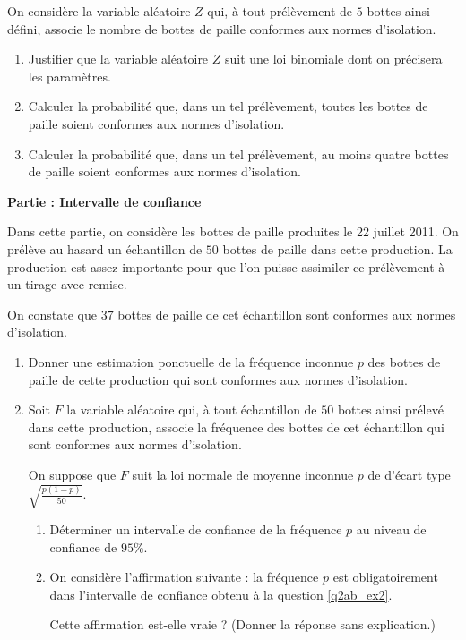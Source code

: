 \documentclass[10pt,a4paper]{article}
\newcounter{num}
\newcounter{Partie}
\newcommand{\Partie}[1]%
   {%
   \goodbreak%
   \addtocounter{Partie}{1}
   \noindent\textbf{Partie \Alph{Partie} : #1}%
   \par%
   }%
\begin{document}
On considère la variable aléatoire $Z$ qui, à tout prélèvement de $5$ bottes
ainsi défini, associe le nombre de bottes de paille conformes aux normes
d'isolation.

\begin{enumerate}
 \item Justifier que la variable aléatoire $Z$ suit une loi binomiale dont on
précisera les paramètres.

\item Calculer la probabilité que, dans un tel prélèvement, toutes les bottes
de paille soient conformes aux normes d'isolation.

\item Calculer la probabilité que, dans un tel prélèvement, au moins quatre
bottes de paille soient conformes aux normes d'isolation.
\end{enumerate}

\Partie{Intervalle de confiance}

Dans cette partie, on considère les bottes de paille produites le 22 juillet
2011. On prélève au hasard un échantillon de $50$ bottes de paille dans cette
production. La production est assez importante pour que l'on puisse assimiler
ce prélèvement à un tirage avec remise.

On constate que $37$ bottes de paille de cet échantillon sont conformes aux
normes d'isolation.

\begin{enumerate}
 \item Donner une estimation ponctuelle de la fréquence inconnue $p$ des
bottes de paille de cette production  qui sont conformes aux normes d'isolation.

\item Soit $F$ la variable aléatoire qui, à tout échantillon de $50$ bottes
ainsi prélevé dans cette production, associe la fréquence des bottes de cet
échantillon qui sont conformes aux normes d'isolation.

On suppose que $F$ suit la loi normale de moyenne inconnue $p$ de d'écart type
$\sqrt{\frac{p(1-p)}{50}}$.

\begin{enumerate}
 \item \label{q2ab_ex2} Déterminer un intervalle de confiance de la fréquence
$p$ au niveau de confiance de $95\%$.

\item On considère l’affirmation suivante : \og la fréquence $p$ est
obligatoirement dans l'intervalle de confiance obtenu à la question
\ref{q2ab_ex2}\fg.

Cette affirmation est-elle vraie ? (Donner la réponse sans explication.)
\end{enumerate}

\end{enumerate}
\end{document}
